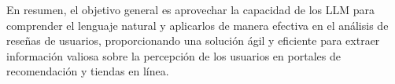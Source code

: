 En resumen, el objetivo general es aprovechar la capacidad de los LLM 
para comprender el lenguaje natural y aplicarlos de manera efectiva en el 
análisis de reseñas de usuarios, proporcionando una solución ágil y 
eficiente para extraer información valiosa sobre la 
percepción de los usuarios en portales de recomendación y tiendas en línea.